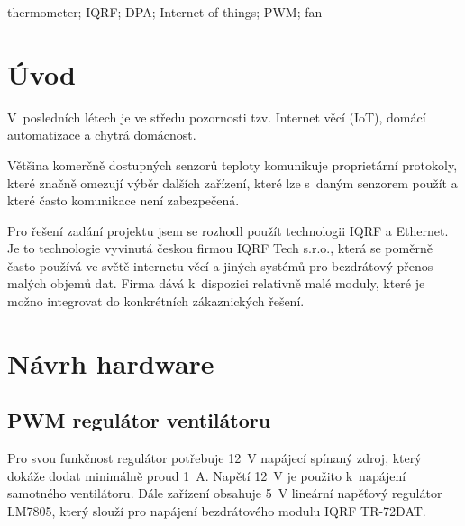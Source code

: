 \documentclass[12pt,a4paper]{article}
\begin{document}
thermometer; IQRF; DPA; Internet of things; PWM; fan

\newpage

\tableofcontents

\newpage

\pagestyle{plain}

\section*{Úvod}


V~posledních létech je ve středu pozornosti tzv. Internet věcí (IoT), domácí automatizace a chytrá domácnost.

Většina komerčně dostupných senzorů teploty komunikuje proprietární protokoly, které značně omezují výběr dalších zařízení, které lze s~daným senzorem použít a které často komunikace není zabezpečená.

Pro řešení zadání projektu jsem se rozhodl použít technologii IQRF a Ethernet. Je to technologie vyvinutá českou firmou IQRF Tech s.r.o., která se poměrně často používá ve světě internetu věcí a jiných systémů pro bezdrátový přenos malých objemů dat. Firma dává k~dispozici relativně malé moduly, které je možno integrovat do konkrétních zákaznických řešení.

\newpage

\section{Návrh hardware}

\subsection{PWM regulátor ventilátoru}

Pro svou funkčnost regulátor potřebuje 12~V napájecí spínaný zdroj, který dokáže dodat minimálně proud 1~A. Napětí 12~V je použito k~napájení samotného ventilátoru. Dále zařízení obsahuje 5~V lineární napěťový regulátor LM7805, který slouží pro napájení bezdrátového modulu IQRF TR-72DAT.
\end{document}

